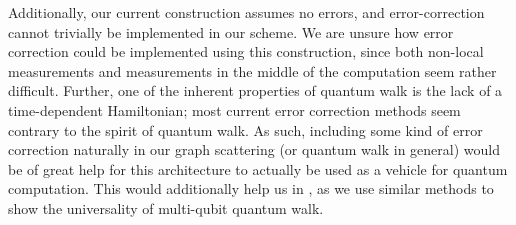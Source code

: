 \documentclass[../thesis-main/thesis-main]{subfiles}
\begin{document}
Additionally, our current construction assumes no errors, and error-correction cannot trivially be implemented in our scheme.  We are unsure how error correction could be implemented using this construction, since both non-local measurements and measurements in the middle of the computation seem rather difficult.  Further, one of the inherent properties of quantum walk is the lack of a time-dependent Hamiltonian; most current error correction methods seem contrary to the spirit of quantum walk.  As such, including some kind of error correction naturally in our graph scattering (or quantum walk in general) would be of great help for this architecture to actually be used as a vehicle for quantum computation.  This would additionally help us in , as we use similar methods to show the universality of multi-qubit quantum walk.


\biblio
\end{document}

